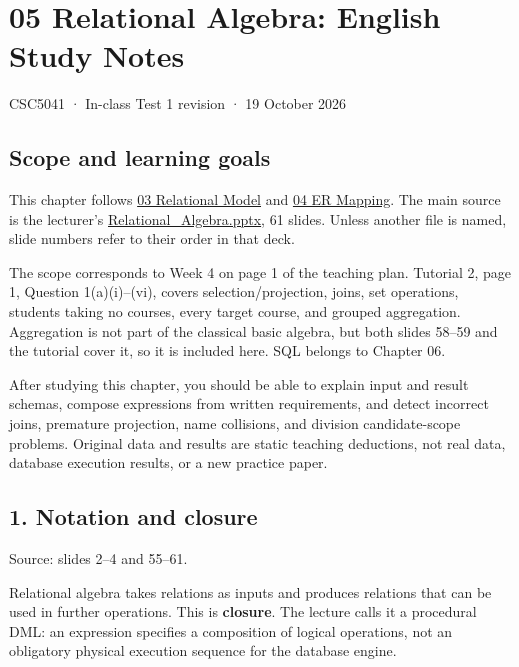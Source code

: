\clearpage
\section{05 Relational Algebra: English Study Notes}\label{05_relational_algebra_en}

CSC5041 · In-class Test 1 revision · 19 October 2026

\subsection{Scope and learning goals}\label{05_relational_algebra_en-scope-and-learning-goals}

This chapter follows \hyperref[03_relational_model_and_integrity_en]{03 Relational Model} and \hyperref[04_er_to_relational_mapping_en]{04 ER Mapping}. The main source is the lecturer's \href{../../../slides/Relational_Algebra.pptx}{Relational\_Algebra.pptx}, 61 slides. Unless another file is named, slide numbers refer to their order in that deck.

The scope corresponds to Week 4 on page 1 of the teaching plan. Tutorial 2, page 1, Question 1(a)(i)--(vi), covers selection/projection, joins, set operations, students taking no courses, every target course, and grouped aggregation. Aggregation is not part of the classical basic algebra, but both slides 58--59 and the tutorial cover it, so it is included here. SQL belongs to Chapter 06.

After studying this chapter, you should be able to explain input and result schemas, compose expressions from written requirements, and detect incorrect joins, premature projection, name collisions, and division candidate-scope problems. Original data and results are static teaching deductions, not real data, database execution results, or a new practice paper.

\subsection{1. Notation and closure}\label{05_relational_algebra_en-notation-and-closure}

Source: slides 2--4 and 55--61.

Relational algebra takes relations as inputs and produces relations that can be used in further operations. This is \textbf{closure}. The lecture calls it a procedural DML: an expression specifies a composition of logical operations, not an obligatory physical execution sequence for the database engine.

